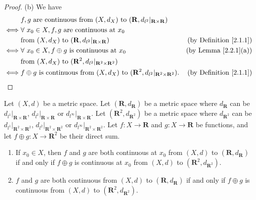 \begin{proof}{(b)}
    We have
    \begin{align*}
             & f, g \text{ are continuous from } (X, d_X) \text{ to } (\mathbf{R}, d_{l^2}|_{\mathbf{R} \times \mathbf{R}})                                                  \\
        \iff & \forall\ x_0 \in X, f, g \text{ are continuous at } x_0                                                                                                       \\
             & \text{from } (X, d_X) \text{ to } (\mathbf{R}, d_{l^2}|_{\mathbf{R} \times \mathbf{R}})                                  & \text{(by Definition \ref{2.1.1})} \\
        \iff & \forall\ x_0 \in X, f \oplus g \text{ is continuous at } x_0                                                             & \text{(by Lemma \ref{2.2.1}(a))}   \\
             & \text{from } (X, d_X) \text{ to } (\mathbf{R}^2, d_{l^2}|_{\mathbf{R}^2 \times \mathbf{R}^2})                                                                 \\
        \iff & f \oplus g \text{ is continuous from } (X, d_X) \text{ to } (\mathbf{R}^2, d_{l^2}|_{\mathbf{R}^2 \times \mathbf{R}^2}). & \text{(by Definition \ref{2.1.1})}
    \end{align*}
\end{proof}

\begin{additional corollary}\label{ac 2.2.1}
Let \((X, d)\) be a metric space.
Let \((\mathbf{R}, d_{\mathbf{R}})\) be a metric space where \(d_{\mathbf{R}}\) can be \(d_{l^1}|_{\mathbf{R} \times \mathbf{R}}\), \(d_{l^2}|_{\mathbf{R} \times \mathbf{R}}\) or \(d_{l^\infty}|_{\mathbf{R} \times \mathbf{R}}\).
Let \((\mathbf{R}^2, d_{\mathbf{R}^2})\) be a metric space where \(d_{\mathbf{R}^2}\) can be \(d_{l^1}|_{\mathbf{R}^2 \times \mathbf{R}^2}\), \(d_{l^2}|_{\mathbf{R}^2 \times \mathbf{R}^2}\) or \(d_{l^\infty}|_{\mathbf{R}^2 \times \mathbf{R}^2}\).
Let \(f : X \to \mathbf{R}\) and \(g : X \to \mathbf{R}\) be functions, and let \(f \oplus g : X \to \mathbf{R}^2\) be their direct sum.
\begin{enumerate}
    \item If \(x_0 \in X\), then \(f\) and \(g\) are both continuous at \(x_0\) from \((X, d)\) to \((\mathbf{R}, d_{\mathbf{R}})\) if and only if \(f \oplus g\) is continuous at \(x_0\) from \((X, d)\) to \((\mathbf{R}^2, d_{\mathbf{R}^2})\).
    \item \(f\) and \(g\) are both continuous from \((X, d)\) to \((\mathbf{R}, d_{\mathbf{R}})\) if and only if \(f \oplus g\) is continuous from \((X, d)\) to \((\mathbf{R}^2, d_{\mathbf{R}^2})\).
\end{enumerate}
\end{additional corollary}

